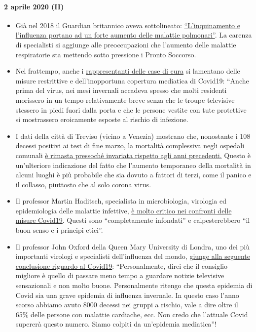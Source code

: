 \hypertarget{2-aprile-2020-ii}{%
\paragraph{2 aprile 2020 (II)}\label{2-aprile-2020-ii}}

\begin{itemize}
\tightlist
\item
  Già nel 2018 il Guardian britannico aveva sottolineato:
  \href{https://www.theguardian.com/society/2018/dec/09/steep-rise-lung-related-illness-hospitals-nhs}{``L'inquinamento
  e l'influenza portano ad un forte aumento delle malattie polmonari''}.
  La carenza di specialisti si aggiunge alle preoccupazioni che
  l'aumento delle malattie respiratorie sta mettendo sotto pressione i
  Pronto Soccorso.
\item
  Nel frattempo, anche i
  \href{https://pflege-prisma.de/2020/03/31/sterbezahlen-in-pflegeheimen/}{rappresentanti
  delle case di cura} si lamentano delle misure restrittive e
  dell'inopportuna copertura mediatica di Covid19: ``Anche prima del
  virus, nei mesi invernali accadeva spesso che molti residenti
  morissero in un tempo relativamente breve senza che le troupe
  televisive stessero in piedi fuori dalla porta e che le persone
  vestite con tute protettive si mostrassero eroicamente esposte al
  rischio di infezione.
\item
  I dati della città di Treviso (vicino a Venezia) mostrano che,
  nonostante i 108 decessi positivi ai test di fine marzo, la mortalità
  complessiva negli ospedali comunali
  \href{https://swprs.files.wordpress.com/2020/04/reppublica-treviso.jpg}{è
  rimasta pressoché invariata rispetto agli anni precedenti.} Questo è
  un'ulteriore indicazione del fatto che l'aumento temporaneo della
  mortalità in alcuni luoghi è più probabile che sia dovuto a fattori di
  terzi, come il panico e il collasso, piuttosto che al solo corona
  virus.
\item
  Il professor Martin Haditsch, specialista in microbiologia, virologia
  ed epidemiologia delle malattie infettive,
  \href{https://www.youtube.com/watch?v=PtzHH8DhgZM}{è molto critico nei
  confronti delle misure Covid19}. Questi sono ``completamente
  infondati'' e calpesterebbero ``il buon senso e i principi etici''.
\item
  Il professor John Oxford della Queen Mary University di Londra, uno
  dei più importanti virologi e specialisti dell'influenza del mondo,
  \href{https://novuscomms.com/2020/03/31/a-view-from-the-hvivo-open-orphan-orph-laboratory-professor-john-oxford/}{giunge
  alla seguente conclusione riguardo al Covid19}: ``Personalmente, direi
  che il consiglio migliore è quello di passare meno tempo a guardare
  notizie televisive sensazionali e non molto buone. Personalmente
  ritengo che questa epidemia di Covid sia una grave epidemia di
  influenza invernale. In questo caso l'anno scorso abbiamo avuto 8000
  decessi nei gruppi a rischio, vale a dire oltre il 65\% delle persone
  con malattie cardiache, ecc. Non credo che l'attuale Covid supererà
  questo numero. Siamo colpiti da un'epidemia mediatica''!
\end{itemize}

